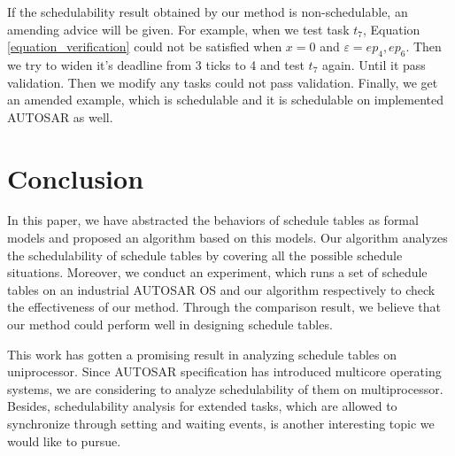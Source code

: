 \documentclass[10pt,conference]{IEEEtran}
\begin{document}
If the schedulability result obtained by our method is non-schedulable, an amending advice will be given. For example, when we test task $t_7$, Equation \ref{equation_verification} could not be satisfied when $x=0$ and $\varepsilon={ep_4,ep_6}$. Then we try to widen it's deadline from 3 ticks to 4 and test $t_7$ again. Until it pass validation. 
Then we modify any tasks could not pass validation. Finally, we get an amended example, which is schedulable and it is schedulable on implemented AUTOSAR as well.


\section{Conclusion}
In this paper, we have abstracted the behaviors of schedule tables as formal models and proposed an algorithm based on this models. Our algorithm analyzes the schedulability of schedule tables by covering all the possible schedule situations. Moreover, we conduct an experiment, which runs a set of schedule tables on an industrial AUTOSAR OS and our algorithm respectively to check the effectiveness of our method. Through the comparison result, we believe that our method could perform well in designing schedule tables.

This work has gotten a promising result in analyzing schedule tables on uniprocessor. Since AUTOSAR specification has introduced multicore operating systems, we are considering to analyze schedulability of them on multiprocessor. Besides, schedulability analysis for extended tasks, which are allowed to synchronize through setting and waiting events, is another interesting topic we would like to pursue.



\end{document}
